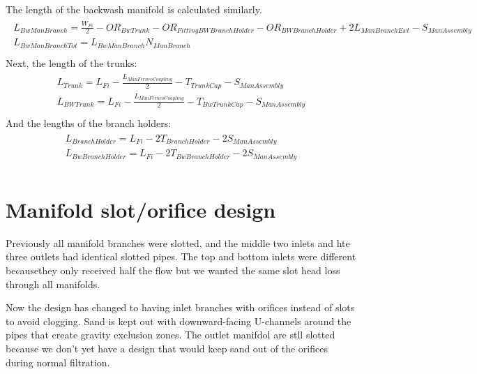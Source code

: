\documentclass[letterpaper,10pt,english]{sphinxmanual}
\begin{document}
The length of the backwash manifold is calculated similarly.
\begin{align}\label{equation:Filtration/Filtration_Derivations:Filtration/Filtration_Derivations:40}\!\begin{aligned}
L_{BwManBranch} = \frac{W_{Fi}}{2} - OR_{BwTrunk} - OR_{FittingBWBranchHolder} - OR_{BWBranchHolder} + 2L_{ManBranchExt} - S_{ManAssembly}\\
L_{BwManBranchTot} = L_{BwManBranch}N_{ManBranch}\\
\end{aligned}\end{align}
Next, the length of the trunks:
\begin{align}\label{equation:Filtration/Filtration_Derivations:Filtration/Filtration_Derivations:41}\!\begin{aligned}
L_{Trunk} = L_{Fi} - \frac{L_{ManFerncoCoupling}}{2} - T_{TrunkCap} - S_{ManAssembly}\\
L_{BWTrunk} = L_{Fi} - \frac{L_{ManFerncoCoupling}}{2} - T_{BwTrunkCap} - S_{ManAssembly}\\
\end{aligned}\end{align}
And the lengths of the branch holders:
\begin{align}\label{equation:Filtration/Filtration_Derivations:Filtration/Filtration_Derivations:42}\!\begin{aligned}
L_{BranchHolder} = L_{Fi} - 2T_{BranchHolder} - 2S_{ManAssembly}\\
L_{BwBranchHolder} = L_{Fi} - 2T_{BwBranchHolder} - 2S_{ManAssembly}\\
\end{aligned}\end{align}

\section{Manifold slot/orifice design}
\label{\detokenize{Filtration/Filtration_Derivations:manifold-slot-orifice-design}}
 Previously all manifold branches were slotted, and the middle two inlets and hte three outlets had identical slotted pipes. The top and bottom inlets  were different becausethey only received half the flow but we wanted the same slot head loss through all manifolds.

Now the design has changed to having inlet branches with orifices instead of slots to avoid clogging. Sand is kept out with downward-facing U-channels around the pipes that create gravity exclusion zones. The outlet manifdol are stll slotted because we don’t yet have a design that would keep sand out of the orifices during normal filtration.
\end{document}
